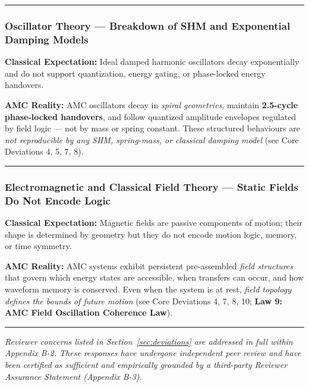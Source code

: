 \documentclass[10pt,aps,pre,onecolumn,superscriptaddress,notitlepage]{revtex4-2}
\begin{document}
\vspace{1em}
\hrule
\vspace{1em}

\subsubsection*{Oscillator Theory — Breakdown of SHM and Exponential Damping Models}

\textbf{Classical Expectation:} Ideal damped harmonic oscillators decay exponentially and do not support quantization, energy gating, or phase-locked energy handovers.

\textbf{AMC Reality:} AMC oscillators decay in \textit{spiral geometries}, maintain \textbf{2.5-cycle phase-locked handovers}, and follow quantized amplitude envelopes regulated by field logic — not by mass or spring constant. These structured behaviours are \textit{not reproducible by any SHM, spring-mass, or classical damping model} (see Core Deviations 4, 5, 7, 8).

\vspace{1em}
\hrule
\vspace{1em}

\subsubsection*{Electromagnetic and Classical Field Theory — Static Fields Do Not Encode Logic}

\textbf{Classical Expectation:} Magnetic fields are passive components of motion; their shape is determined by geometry but they do not encode motion logic, memory, or time symmetry.

\textbf{AMC Reality:} AMC systems exhibit persistent pre-assembled \textit{field structures} that govern which energy states are accessible, when transfers can occur, and how waveform memory is conserved. Even when the system is at rest, \textit{field topology defines the bounds of future motion} (see Core Deviations 4, 7, 8, 10; \textbf{Law 9: AMC Field Oscillation Coherence Law}).

\vspace{1em}
\hrule
\vspace{1em}

\textit{Reviewer concerns listed in Section~\ref{sec:deviations} are addressed in full within Appendix B-2. These responses have undergone independent peer review and have been certified as sufficient and empirically grounded by a third-party Reviewer Assurance Statement (Appendix B-3).}
\end{document}
